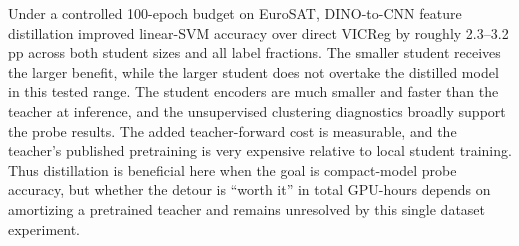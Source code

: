 \documentclass[10pt]{article}
\begin{document}
Under a controlled 100-epoch budget on EuroSAT, DINO-to-CNN feature
distillation improved linear-SVM accuracy over direct VICReg by roughly
2.3--3.2 pp across both student sizes and all label fractions. The smaller
student receives the larger benefit, while the larger student does not
overtake the distilled model in this tested range. The student encoders
are much smaller and faster than the teacher at inference, and the
unsupervised clustering diagnostics broadly support the probe results.
The added teacher-forward cost is measurable, and the teacher's published
pretraining is very expensive relative to local student training. Thus
distillation is beneficial here when the goal is compact-model probe
accuracy, but whether the detour is ``worth it'' in total GPU-hours depends
on amortizing a pretrained teacher and remains unresolved by this single
dataset experiment.
\end{document}
